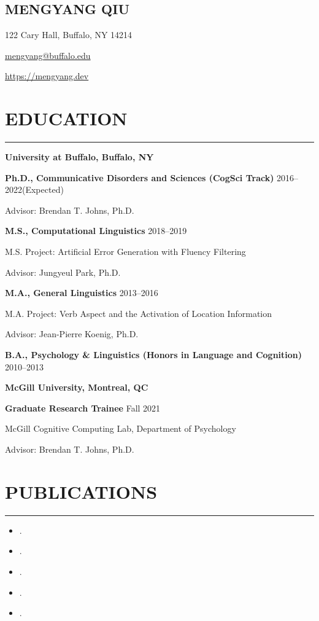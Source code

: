 \documentclass[11pt]{article}
\newcommand{\name}[1]{\begin{center}\section*{\Huge #1}\end{center}}
\newcommand{\topinfo}[1]{\begin{center}\vspace{-0.2cm}#1\vspace{-0.2cm}\end{center}}
\newcommand{\cvsection}[1]{\vspace{-0.2cm}\section*{\Large #1}\vspace{-0.2cm}\hrule\vspace{0.2cm}}
\newcommand{\h}[1]{\hspace{15pt} #1}
\begin{document}
\name{MENGYANG QIU}
\topinfo{122 Cary Hall, Buffalo, NY 14214}
\topinfo{\href{mailto:mengyang@buffalo.edu}{mengyang@buffalo.edu}}
\topinfo{\url{https://mengyang.dev}}



\cvsection{EDUCATION}

\textbf{\large University at Buffalo, Buffalo, NY}

\textbf{Ph.D., Communicative Disorders and Sciences (CogSci Track)} \hfill 2016--2022(Expected)

\h{Advisor: Brendan T. Johns, Ph.D.}

\textbf{M.S., Computational Linguistics} \hfill 2018--2019

\h{M.S. Project: Artificial Error Generation with Fluency Filtering}

\h{Advisor: Jungyeul Park, Ph.D.}

\textbf{M.A., General Linguistics} \hfill 2013--2016

\h{M.A. Project: Verb Aspect and the Activation of Location Information}

\h{Advisor: Jean-Pierre Koenig, Ph.D.}

\textbf{B.A., Psychology \& Linguistics (Honors in Language and Cognition)} \hfill 2010--2013

\bigskip

\textbf{\large McGill University, Montreal, QC}

\textbf{Graduate Research Trainee} \hfill Fall 2021

\h{McGill Cognitive Computing Lab, Department of Psychology}

\h{Advisor: Brendan T. Johns, Ph.D.}

\cvsection{PUBLICATIONS}

\begin{itemize}[leftmargin=!,labelindent=!,itemindent=-18pt]
    \setlength\itemsep{0.3em}

    \item[] .
    \item[] .
    \item[] .
    \item[] .
    \item[] .

\end{itemize}
\end{document}
